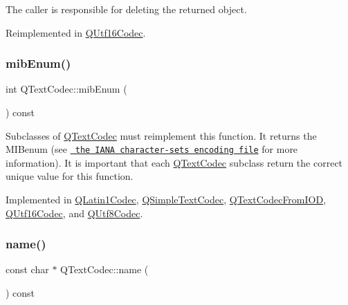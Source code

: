 The caller is responsible for deleting the returned object. 

Reimplemented in \mbox{\hyperlink{class_q_utf16_codec_a09e6f9d5f05c5a7cf730841b28301ae5}{Q\+Utf16\+Codec}}.

\mbox{\label{class_q_text_codec_aa0118daa4f82235ae9d5bb70a168c992}} 
\subsubsection{\texorpdfstring{mibEnum()}{mibEnum()}}
{\footnotesize\ttfamily int Q\+Text\+Codec\+::mib\+Enum (\begin{DoxyParamCaption}{ }\end{DoxyParamCaption}) const\hspace{0.3cm}{\ttfamily [pure virtual]}}

Subclasses of \mbox{\hyperlink{class_q_text_codec}{Q\+Text\+Codec}} must reimplement this function. It returns the M\+I\+Benum (see \href{ftp://ftp.isi.edu/in-notes/iana/assignments/character-sets}{\texttt{ the I\+A\+NA character-\/sets encoding file}} for more information). It is important that each \mbox{\hyperlink{class_q_text_codec}{Q\+Text\+Codec}} subclass return the correct unique value for this function. 

Implemented in \mbox{\hyperlink{class_q_latin1_codec_a85348b77e2a1324f907a222b3a3d81d1}{Q\+Latin1\+Codec}}, \mbox{\hyperlink{class_q_simple_text_codec_aa1617c3384f129a43dfd0edc15177eaf}{Q\+Simple\+Text\+Codec}}, \mbox{\hyperlink{class_q_text_codec_from_i_o_d_aa2a1123c86835c8395a058082c9fbdd3}{Q\+Text\+Codec\+From\+I\+OD}}, \mbox{\hyperlink{class_q_utf16_codec_aac5f0273efa632dd14125464094b581e}{Q\+Utf16\+Codec}}, and \mbox{\hyperlink{class_q_utf8_codec_aab3ccc43cc2595bc81e5fbf2d5b2776a}{Q\+Utf8\+Codec}}.

\mbox{\label{class_q_text_codec_a5b735ce19dc6b0fb0e8858bd3f54f0e2}} 
\subsubsection{\texorpdfstring{name()}{name()}}
{\footnotesize\ttfamily const char $\ast$ Q\+Text\+Codec\+::name (\begin{DoxyParamCaption}{ }\end{DoxyParamCaption}) const\hspace{0.3cm}{\ttfamily [pure virtual]}}

